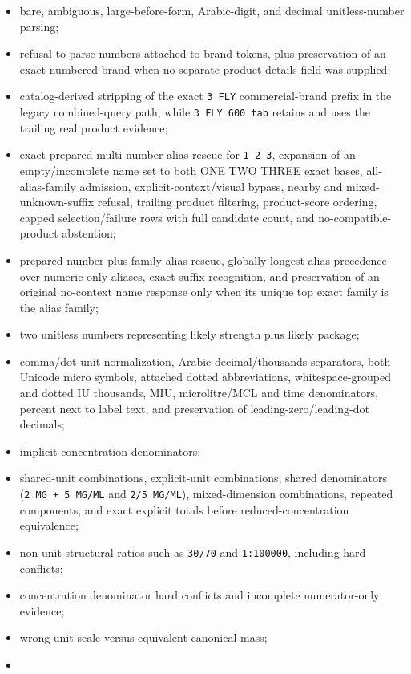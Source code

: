 \begin{itemize}
\tightlist
\item
  bare, ambiguous, large-before-form, Arabic-digit, and decimal unitless-number parsing;
\item
  refusal to parse numbers attached to brand tokens, plus preservation of an exact numbered brand when no separate product-details field was supplied;
\item
  catalog-derived stripping of the exact \texttt{3\ FLY} commercial-brand prefix in the legacy combined-query path, while \texttt{3\ FLY\ 600\ tab} retains and uses the trailing real product evidence;
\item
  exact prepared multi-number alias rescue for \texttt{1\ 2\ 3}, expansion of an empty/incomplete name set to both ONE TWO THREE exact bases, all-alias-family admission, explicit-context/visual bypass, nearby and mixed-unknown-suffix refusal, trailing product filtering, product-score ordering, capped selection/failure rows with full candidate count, and no-compatible-product abstention;
\item
  prepared number-plus-family alias rescue, globally longest-alias precedence over numeric-only aliases, exact suffix recognition, and preservation of an original no-context name response only when its unique top exact family is the alias family;
\item
  two unitless numbers representing likely strength plus likely package;
\item
  comma/dot unit normalization, Arabic decimal/thousands separators, both Unicode micro symbols, attached dotted abbreviations, whitespace-grouped and dotted IU thousands, MIU, microlitre/MCL and time denominators, percent next to label text, and preservation of leading-zero/leading-dot decimals;
\item
  implicit concentration denominators;
\item
  shared-unit combinations, explicit-unit combinations, shared denominators (\texttt{2\ MG\ +\ 5\ MG/ML} and \texttt{2/5\ MG/ML}), mixed-dimension combinations, repeated components, and exact explicit totals before reduced-concentration equivalence;
\item
  non-unit structural ratios such as \texttt{30/70} and \texttt{1:100000}, including hard conflicts;
\item
  concentration denominator hard conflicts and incomplete numerator-only evidence;
\item
  wrong unit scale versus equivalent canonical mass;
\item

\end{itemize}
